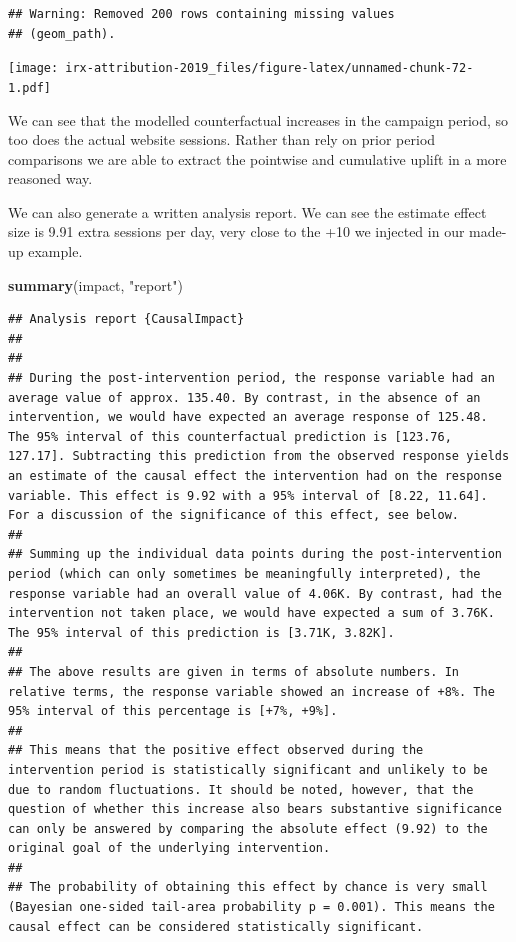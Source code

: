 \documentclass[]{book}
\newenvironment{Shaded}{\begin{snugshade}}{\end{snugshade}}
\newcommand{\KeywordTok}[1]{\textcolor[rgb]{0.13,0.29,0.53}{\textbf{#1}}}
\newcommand{\NormalTok}[1]{#1}
\newcommand{\StringTok}[1]{\textcolor[rgb]{0.31,0.60,0.02}{#1}}
\begin{document}
\begin{verbatim}
## Warning: Removed 200 rows containing missing values
## (geom_path).
\end{verbatim}

\texttt{[image: irx-attribution-2019\_files/figure-latex/unnamed-chunk-72-1.pdf]}

We can see that the modelled counterfactual increases in the campaign period, so
too does the actual website sessions. Rather than rely on prior period comparisons
we are able to extract the pointwise and cumulative uplift in a more reasoned way.

We can also generate a written analysis report. We can see the estimate
effect size is 9.91 extra sessions per day, very close to the +10 we injected
in our made-up example.

\begin{Shaded}
\begin{Highlighting}[]
\KeywordTok{summary}\NormalTok{(impact, }\StringTok{"report"}\NormalTok{)}
\end{Highlighting}
\end{Shaded}

\begin{verbatim}
## Analysis report {CausalImpact}
## 
## 
## During the post-intervention period, the response variable had an average value of approx. 135.40. By contrast, in the absence of an intervention, we would have expected an average response of 125.48. The 95% interval of this counterfactual prediction is [123.76, 127.17]. Subtracting this prediction from the observed response yields an estimate of the causal effect the intervention had on the response variable. This effect is 9.92 with a 95% interval of [8.22, 11.64]. For a discussion of the significance of this effect, see below.
## 
## Summing up the individual data points during the post-intervention period (which can only sometimes be meaningfully interpreted), the response variable had an overall value of 4.06K. By contrast, had the intervention not taken place, we would have expected a sum of 3.76K. The 95% interval of this prediction is [3.71K, 3.82K].
## 
## The above results are given in terms of absolute numbers. In relative terms, the response variable showed an increase of +8%. The 95% interval of this percentage is [+7%, +9%].
## 
## This means that the positive effect observed during the intervention period is statistically significant and unlikely to be due to random fluctuations. It should be noted, however, that the question of whether this increase also bears substantive significance can only be answered by comparing the absolute effect (9.92) to the original goal of the underlying intervention.
## 
## The probability of obtaining this effect by chance is very small (Bayesian one-sided tail-area probability p = 0.001). This means the causal effect can be considered statistically significant.
\end{verbatim}
\end{document}
